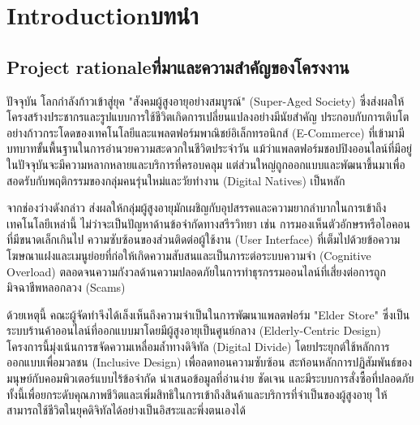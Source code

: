 \chapter{\ifenglish Introduction\else บทนำ\fi}

\section{\ifenglish Project rationale\else ที่มาและความสำคัญของโครงงาน\fi}
ปัจจุบัน โลกกำลังก้าวเข้าสู่ยุค "สังคมผู้สูงอายุอย่างสมบูรณ์" (Super-Aged Society) ซึ่งส่งผลให้โครงสร้างประชากรและรูปแบบการใช้ชีวิตเกิดการเปลี่ยนแปลงอย่างมีนัยสำคัญ \cite{accessibility_elderly_2012} ประกอบกับการเติบโตอย่างก้าวกระโดดของเทคโนโลยีและแพลตฟอร์มพาณิชย์อิเล็กทรอนิกส์ (E-Commerce) ที่เข้ามามีบทบาทขั้นพื้นฐานในการอำนวยความสะดวกในชีวิตประจำวัน แม้ว่าแพลตฟอร์มชอปปิงออนไลน์ที่มีอยู่ในปัจจุบันจะมีความหลากหลายและบริการที่ครอบคลุม แต่ส่วนใหญ่ถูกออกแบบและพัฒนาขึ้นมาเพื่อสอดรับกับพฤติกรรมของกลุ่มคนรุ่นใหม่และวัยทำงาน (Digital Natives) เป็นหลัก \cite{ecommerce2019}

จากช่องว่างดังกล่าว ส่งผลให้กลุ่มผู้สูงอายุมักเผชิญกับอุปสรรคและความยากลำบากในการเข้าถึงเทคโนโลยีเหล่านี้ ไม่ว่าจะเป็นปัญหาด้านข้อจำกัดทางสรีรวิทยา เช่น การมองเห็นตัวอักษรหรือไอคอนที่มีขนาดเล็กเกินไป ความซับซ้อนของส่วนติดต่อผู้ใช้งาน (User Interface) ที่เต็มไปด้วยข้อความโฆษณาแฝงและเมนูย่อยที่ก่อให้เกิดความสับสนและเป็นภาระต่อระบบความจำ (Cognitive Overload) \cite{wai_older_users} ตลอดจนความกังวลด้านความปลอดภัยในการทำธุรกรรมออนไลน์ที่เสี่ยงต่อการถูกมิจฉาชีพหลอกลวง (Scams)

ด้วยเหตุนี้ คณะผู้จัดทำจึงได้เล็งเห็นถึงความจำเป็นในการพัฒนาแพลตฟอร์ม "Elder Store" ซึ่งเป็นระบบร้านค้าออนไลน์ที่ออกแบบมาโดยมีผู้สูงอายุเป็นศูนย์กลาง (Elderly-Centric Design) โครงการนี้มุ่งเน้นการขจัดความเหลื่อมล้ำทางดิจิทัล (Digital Divide) โดยประยุกต์ใช้หลักการออกแบบเพื่อมวลชน (Inclusive Design) \cite{inclusive2022} เพื่อลดทอนความซับซ้อน สะท้อนหลักการปฏิสัมพันธ์ของมนุษย์กับคอมพิวเตอร์แบบไร้ข้อจำกัด \cite{shneiderman2010} นำเสนอข้อมูลที่อ่านง่าย ชัดเจน และมีระบบการสั่งซื้อที่ปลอดภัย ทั้งนี้เพื่อยกระดับคุณภาพชีวิตและเพิ่มสิทธิในการเข้าถึงสินค้าและบริการที่จำเป็นของผู้สูงอายุ ให้สามารถใช้ชีวิตในยุคดิจิทัลได้อย่างเป็นอิสระและพึ่งตนเองได้

